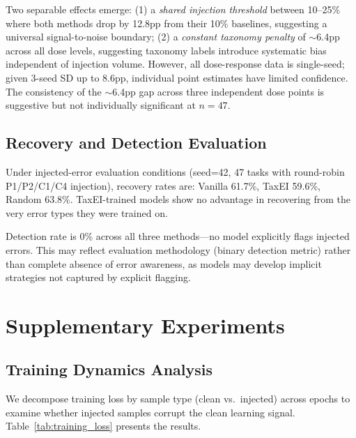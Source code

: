 \documentclass[11pt,a4paper]{article}
\begin{document}
Two separable effects emerge: (1) a \emph{shared injection threshold} between 10--25\% where both methods drop by 12.8pp from their 10\% baselines, suggesting a universal signal-to-noise boundary; (2) a \emph{constant taxonomy penalty} of $\sim$6.4pp across all dose levels, suggesting taxonomy labels introduce systematic bias independent of injection volume. However, all dose-response data is single-seed; given 3-seed SD up to 8.6pp, individual point estimates have limited confidence. The consistency of the $\sim$6.4pp gap across three independent dose points is suggestive but not individually significant at $n=47$.

\subsection{Recovery and Detection Evaluation}

Under injected-error evaluation conditions (seed=42, 47 tasks with round-robin P1/P2/C1/C4 injection), recovery rates are: Vanilla 61.7\%, TaxEI 59.6\%, Random 63.8\%. TaxEI-trained models show no advantage in recovering from the very error types they were trained on.

Detection rate is 0\% across all three methods---no model explicitly flags injected errors. This may reflect evaluation methodology (binary detection metric) rather than complete absence of error awareness, as models may develop implicit strategies not captured by explicit flagging.

\section{Supplementary Experiments}
\label{sec:supp}

\subsection{Training Dynamics Analysis}
\label{sec:training_dynamics}

We decompose training loss by sample type (clean vs.\ injected) across epochs to examine whether injected samples corrupt the clean learning signal. Table~\ref{tab:training_loss} presents the results.
\end{document}
